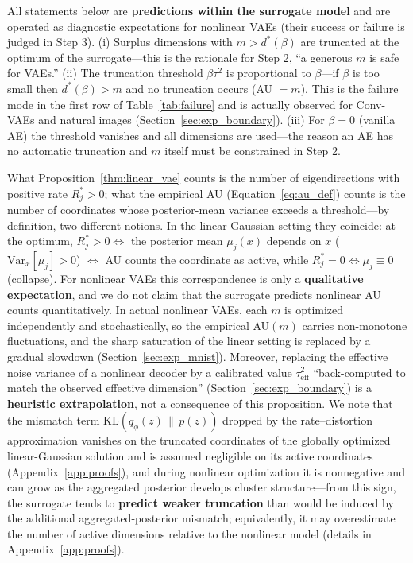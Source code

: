 \documentclass[make,article,submit,pdftex,moreauthors]{Definitions/mdpi}
\newcommand{\dstar}{d^{*}(\beta)}
\begin{document}
\begin{Remark}\label{rem:implication}
All statements below are \textbf{predictions within the surrogate model}
and are operated as diagnostic expectations for nonlinear VAEs (their
success or failure is judged in Step 3).
(i) Surplus dimensions with $m > \dstar$ are truncated at the optimum of
the surrogate---this is the rationale for Step 2, ``a generous $m$ is safe
for VAEs.''
(ii) The truncation threshold $\beta\tau^2$ is proportional to $\beta$---if
$\beta$ is too small then $\dstar > m$ and no truncation occurs
(AU $= m$).
This is the failure mode in the first row of Table~\ref{tab:failure} and is
actually observed for Conv-VAEs and natural images
(Section~\ref{sec:exp_boundary}).
(iii) For $\beta = 0$ (vanilla AE) the threshold vanishes and all
dimensions are used---the reason an AE has no automatic truncation and $m$
itself must be constrained in Step 2.
\end{Remark}

\begin{Remark}\label{rem:bridge}
What Proposition~\ref{thm:linear_vae} counts is the number of
eigendirections with positive rate $R_j^* > 0$; what the empirical AU
(Equation~\eqref{eq:au_def}) counts is the number of coordinates whose
posterior-mean variance exceeds a threshold---by definition, two different
notions.
In the linear-Gaussian setting they coincide: at the optimum,
$R_j^* > 0 \iff$ the posterior mean $\mu_j(x)$ depends on $x$
($\mathrm{Var}_x[\mu_j] > 0$) $\iff$ AU counts the coordinate as active,
while $R_j^* = 0 \iff \mu_j \equiv 0$ (collapse).
For nonlinear VAEs this correspondence is only a \textbf{qualitative
expectation}, and we do not claim that the surrogate predicts nonlinear AU
counts quantitatively.
In actual nonlinear VAEs, each $m$ is optimized independently and
stochastically, so the empirical AU$(m)$ carries non-monotone fluctuations,
and the sharp saturation of the linear setting is replaced by a gradual
slowdown (Section~\ref{sec:exp_mnist}).
Moreover, replacing the effective noise variance of a nonlinear decoder by a
calibrated value $\tau^2_{\mathrm{eff}}$ ``back-computed to match the
observed effective dimension'' (Section~\ref{sec:exp_boundary}) is a
\textbf{heuristic extrapolation}, not a consequence of this proposition.
We note that the mismatch term $\mathrm{KL}(q_\phi(z)\,\|\,p(z))$ dropped by
the rate--distortion approximation vanishes on the truncated coordinates of
the globally optimized linear-Gaussian solution and is assumed negligible
on its active coordinates (Appendix~\ref{app:proofs}), and during nonlinear
optimization it is
nonnegative and can grow as the aggregated posterior develops cluster
structure---from this sign, the surrogate tends to \textbf{predict weaker
truncation} than would be induced by the additional aggregated-posterior
mismatch; equivalently, it may overestimate the number of active dimensions
relative to the nonlinear model (details in Appendix~\ref{app:proofs}).
\end{Remark}
\end{document}
